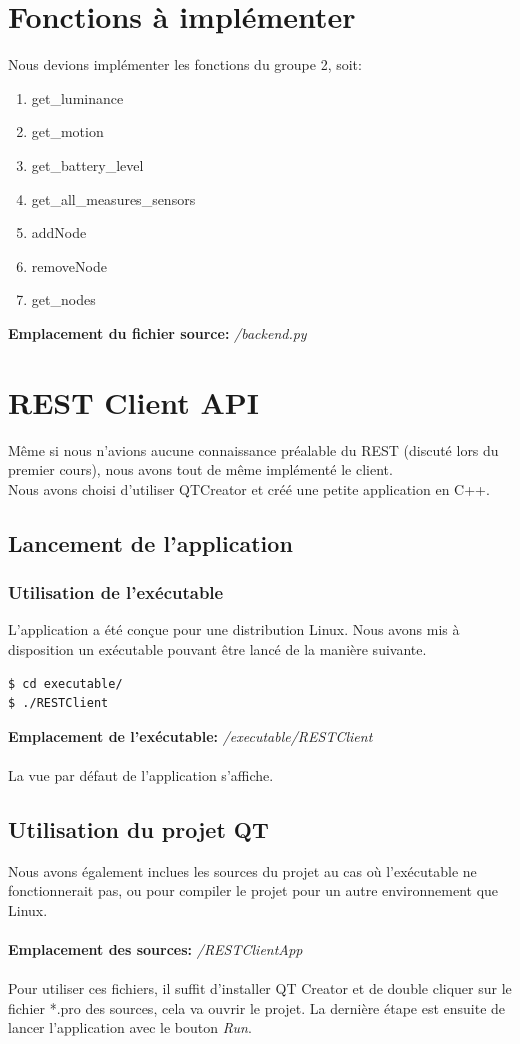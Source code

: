 \section{Fonctions à implémenter}
Nous devions implémenter les fonctions du groupe 2, soit:
\begin{enumerate}
	\item get\_luminance
	\item get\_motion
	\item get\_battery\_level
	\item get\_all\_measures\_sensors
	\item addNode
	\item removeNode
	\item get\_nodes\\
\end{enumerate}
\textbf{Emplacement du fichier source: }\textit{/backend.py}
\section{REST Client API}
Même si nous n'avions aucune connaissance préalable du REST (discuté lors du premier cours), nous avons tout de même implémenté le client.\\
Nous avons choisi d'utiliser QTCreator et créé une petite application en C++.
\subsection{Lancement de l'application}
\subsubsection{Utilisation de l'exécutable}
L'application a été conçue pour une distribution Linux. Nous avons mis à disposition un exécutable pouvant être lancé de la manière suivante.
\begin{lstlisting}
$ cd executable/
$ ./RESTClient 
\end{lstlisting}
\textbf{Emplacement de l'exécutable: }\textit{/executable/RESTClient}\\\\
La vue par défaut de l'application s'affiche.
\subsection{Utilisation du projet QT}
Nous avons également inclues les sources du projet au cas où l'exécutable ne fonctionnerait pas, ou pour compiler le projet pour un autre environnement que Linux.\\\\
\textbf{Emplacement des sources: }\textit{/RESTClientApp}\\\\
Pour utiliser ces fichiers, il suffit d'installer QT Creator et de double cliquer sur le fichier *.pro des sources, cela va ouvrir le projet. La dernière étape est ensuite de lancer l'application avec le bouton \textit{Run}.
